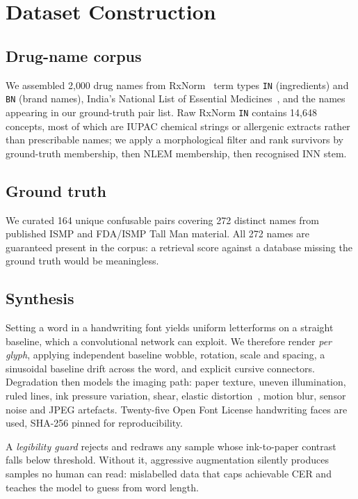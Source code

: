 \documentclass[conference]{IEEEtran}
\begin{document}
\section{Dataset Construction}\label{sec:data}

\subsection{Drug-name corpus}
We assembled 2{,}000 drug names from RxNorm~\cite{nlm2024rxnorm} term types
\texttt{IN} (ingredients) and \texttt{BN} (brand names), India's National List
of Essential Medicines~\cite{mohfw2022nlem}, and the names appearing in our
ground-truth pair list. Raw RxNorm \texttt{IN} contains 14{,}648 concepts, most
of which are IUPAC chemical strings or allergenic extracts rather than
prescribable names; we apply a morphological filter and rank survivors by
ground-truth membership, then NLEM membership, then recognised INN stem.

\subsection{Ground truth}
We curated 164 unique confusable pairs covering 272 distinct names from
published ISMP and FDA/ISMP Tall Man material. All 272 names are guaranteed
present in the corpus: a retrieval score against a database missing the ground
truth would be meaningless.

\subsection{Synthesis}
Setting a word in a handwriting font yields uniform letterforms on a straight
baseline, which a convolutional network can exploit. We therefore render
\emph{per glyph}, applying independent baseline wobble, rotation, scale and
spacing, a sinusoidal baseline drift across the word, and explicit cursive
connectors. Degradation then models the imaging path: paper texture, uneven
illumination, ruled lines, ink pressure variation, shear, elastic
distortion~\cite{simard2003elastic}, motion blur, sensor noise and JPEG
artefacts. Twenty-five Open Font License handwriting faces are used, SHA-256
pinned for reproducibility.

A \emph{legibility guard} rejects and redraws any sample whose ink-to-paper
contrast falls below threshold. Without it, aggressive augmentation silently
produces samples no human can read: mislabelled data that caps achievable CER
and teaches the model to guess from word length.
\end{document}
